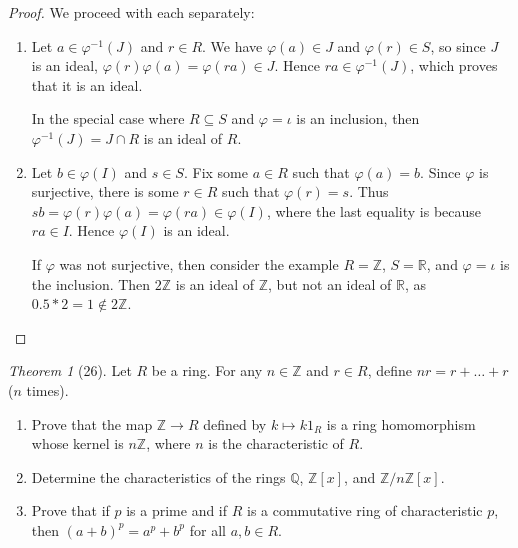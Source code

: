 \documentclass[12pt]{article}
\theoremstyle{remark}
\theoremstyle{named}
\newtheorem*{theorem}{Theorem}
\newcommand{\Z}{\mathbb Z}
\begin{document}
\begin{proof}
    We proceed with each separately:
    \begin{enumerate}
        \item Let \(a \in \varphi^{-1}(J)\) and \(r \in R\). We have \(\varphi(a) \in J\) and \(\varphi(r) \in S\), so since \(J\) is an ideal, \(\varphi(r)\varphi(a) = \varphi(ra) \in J\). Hence \(ra \in \varphi^{-1}(J)\), which proves that it is an ideal. 
        
        In the special case where \(R \subseteq S\) and \(\varphi = \iota\) is an inclusion, then \(\varphi^{-1}(J) = J \cap R\) is an ideal of \(R\).

        \item Let \(b \in \varphi(I)\) and \(s \in S\). Fix some \(a \in R\) such that \(\varphi(a) = b\). Since \(\varphi\) is surjective, there is some \(r \in R\) such that \(\varphi(r) = s\). Thus \(sb = \varphi(r)\varphi(a) = \varphi(ra) \in \varphi(I)\), where the last equality is because \(ra \in I\). Hence \(\varphi(I)\) is an ideal. 
        
        If \(\varphi\) was not surjective, then consider the example \(R = \Z\), \(S = \mathbb R\), and \(\varphi = \iota\) is the inclusion. Then \(2\Z\) is an ideal of \(\Z\), but not an ideal of \(\mathbb R\), as \(0.5 * 2 = 1 \notin 2\Z\).
    \end{enumerate}
\end{proof}


\begin{theorem}[26]
    Let \(R\) be a ring. For any \(n \in \Z\) and \(r \in R\), define \(nr = r + \dots + r\) (\(n\) times).
    \begin{enumerate}
        \item Prove that the map \(\Z \to R\) defined by \(k \mapsto k1_R\) is a ring homomorphism whose kernel is \(n \Z\), where \(n\) is the characteristic of \(R\). 
        \item Determine the characteristics of the rings \(\mathbb Q\), \(\Z[x]\), and \(\Z / n \Z [x]\).
        \item Prove that if \(p\) is a prime and if \(R\) is a commutative ring of characteristic \(p\), then \((a + b)^p = a^p + b^p\) for all \(a, b \in R\). 
    \end{enumerate}
\end{theorem}
\end{document}
